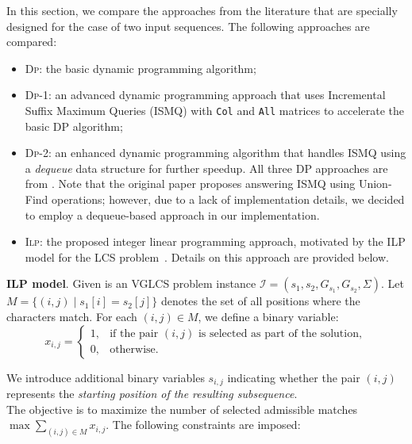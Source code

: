 \documentclass[runningheads]{llncs}
\begin{document}
In this section, we compare the approaches from the literature that are specially designed for the case of two input sequences. The following approaches are compared:

\begin{itemize}
	\item \textsc{Dp}: the basic dynamic programming algorithm;
	\item \textsc{Dp}-1: an advanced dynamic programming approach that uses Incremental Suffix Maximum Queries (ISMQ) with \texttt{Col} and \texttt{All} matrices to accelerate the basic DP algorithm;
	\item \textsc{Dp}-2: an enhanced dynamic programming algorithm that handles ISMQ using a \textit{dequeue} data structure for further speedup. All three DP approaches are from \cite{penga2011longest}. Note that the original paper proposes answering ISMQ using Union-Find operations; however, due to a lack of implementation details, we decided to employ a dequeue-based approach in our implementation.
	\item \textsc{Ilp}: the proposed integer linear programming approach, motivated by the ILP model for the LCS problem~\cite{blum2016metaheuristics}. Details on this approach are provided below. 
	
\end{itemize}

\textbf{ILP model}. Given is an VGLCS problem instance $\mathcal{I}=(s_1, s_2, G_{s_1}, G_{s_2}, \Sigma)$. Let $M = \{ (i,j) \mid s_1[i] = s_2[j] \}$ denotes the set of all positions where the characters match. For each $(i,j) \in M$, we define a binary variable:
\[
x_{i,j} =
\begin{cases}
	1, & \textrm{if the pair } (i,j) \textrm{ is selected as part of the solution}, \\
	0, & \textrm{otherwise}.
\end{cases}
\]

We introduce additional binary variables $s_{i,j}$ indicating whether the pair $(i,j)$ represents the \emph{starting position of the resulting subsequence}. \\

The objective is to maximize the number of selected admissible matches $
\max \sum_{(i,j) \in M} x_{i,j}$. The following constraints are imposed:
\end{document}

